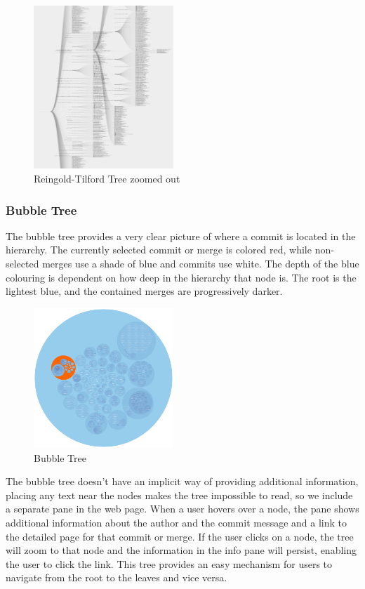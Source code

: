 \documentclass[conference, draftclsnofoot]{IEEEtran}
\begin{document}
\begin{figure}
        \centering
        \includegraphics[width=0.47\textwidth]{figures/tree_zoom.png}
        \caption{Reingold-Tilford Tree zoomed out}
        \label{fig:zoomed_tree}
\end{figure}

\subsubsection{Bubble Tree}

The bubble tree provides a very clear picture of where a commit is located in the
hierarchy. The currently selected commit or merge is colored red, while non-selected
merges use a shade of blue and commits use white. The depth of the blue colouring is
dependent on how deep in the hierarchy that node is. The root is the lightest blue,
and the contained merges are progressively darker.

\begin{figure}
        \centering
        \includegraphics[width=0.47\textwidth]{figures/bubble_tree.pdf}
        \caption{Bubble Tree}
        \label{fig:bubble_tree}
\end{figure}

The bubble tree doesn't have an implicit way of providing additional information,
placing any text near the nodes makes the tree impossible to read, so we include a
separate pane in the web page. When a user hovers over a node, the pane shows
additional information about the author and the commit message and a link to the
detailed page for that commit or merge. If the user clicks on a node, the tree will
zoom to that node and the information in the info pane will persist, enabling the
user to click the link. This tree provides an easy mechanism for users to navigate
from the root to the leaves and vice versa.
\end{document}
